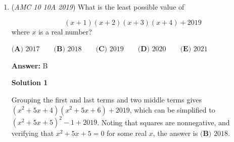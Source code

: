 \begin{enumerate}
\textbf{Solution 9 (No Modular Arithmetic, Solving the Quadratic)}

$0.\overline{23}_k=\dfrac{23_k}{k^2-1}=\dfrac{2\times k^1+3\times k^0}{k^2-1}=\dfrac{2k+3}{k^2-1}$, so our equation is just $\dfrac7{51}=\dfrac{2k+3}{k^2-1}$, so now let's solve!

 
 \begin{align*}     \dfrac7{51}&=\dfrac{2k+3}{k^2-1}\\     7k^2-7&=102k+153\\     7k^2-102k-160&=0,\\ \end{align*}


 and now let's solve this equation with the Quadratic Formula!

 
 \begin{align*}     k&=\dfrac{-(-102)\pm\sqrt{(-102)^2-4(7)(-160)}}{2\times7}\\     k&=\dfrac{102\pm\sqrt{10404+4480}}{14}\\     k&=\dfrac{102\pm\sqrt{14884}}{14}\\     k&=\dfrac{102\pm122}{14}, \end{align*}


 and we are given that $k$ is a positive integer, so we will take the plus and not the minus since the minus will produce a negative non-integer value for $k$ in this case. Therefore, 
 \[k=\dfrac{102+122}{14}=\dfrac{224}{14}=\boxed{16}.\]

 Education, the Study of Everything

 


	\item (\textit{AMC 10 10A 2019}) What is the least possible value of

 \[(x+1)(x+2)(x+3)(x+4)+2019\]where $x$ is a real number?


 $\textbf{(A) } 2017 \qquad\textbf{(B) } 2018 \qquad\textbf{(C) } 2019 \qquad\textbf{(D) } 2020 \qquad\textbf{(E) } 2021$

 \textbf{Answer: }B



\textbf{Solution 1}

Grouping the first and last terms and two middle terms gives $(x^2+5x+4)(x^2+5x+6)+2019$, which can be simplified to $(x^2+5x+5)^2-1+2019$. Noting that squares are nonnegative, and verifying that $x^2+5x+5=0$ for some real $x$, the answer is $\boxed{\textbf{(B) } 2018}$.

 



\end{enumerate}
